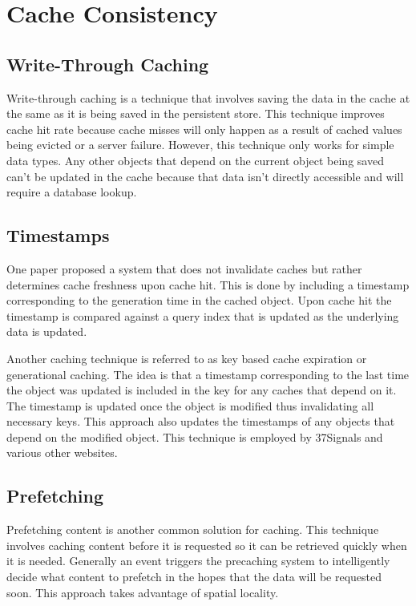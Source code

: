 \documentclass[12pt]{ucthesis}
\begin{document}
\section{Cache Consistency}
\subsection{Write-Through Caching}
Write-through caching is a technique that involves saving the data in the cache at the same as it is being saved in the persistent store.\cite{writeThroughCaching}
This technique improves cache hit rate because cache misses will only happen as a result of cached values being evicted or a server failure.
However, this technique only works for simple data types.
Any other objects that depend on the current object being saved can't be updated in the cache because that data isn't directly accessible and will require a database lookup.

\subsection{Timestamps}
One paper proposed a system that does not invalidate caches but rather determines cache freshness upon cache hit.\cite{cacheInvalidationWebSearch}
This is done by including a timestamp corresponding to the generation time in the cached object.
Upon cache hit the timestamp is compared against a query index that is updated as the underlying data is updated.

Another caching technique is referred to as key based cache expiration\cite{keyBasedCacheExpiration} or generational caching\cite{generationalCaching}.
The idea is that a timestamp corresponding to the last time the object was updated is included in the key for any caches that depend on it.
The timestamp is updated once the object is modified thus invalidating all necessary keys.
This approach also updates the timestamps of any objects that depend on the modified object.
This technique is employed by 37Signals and various other websites.\cite{keyBasedCacheExpiration}

\subsection{Prefetching}
Prefetching content is another common solution for caching.
This technique involves caching content before it is requested so it can be retrieved quickly when it is needed.
Generally an event triggers the precaching system to intelligently decide what content to prefetch in the hopes that the data will be requested soon.
This approach takes advantage of spatial locality.
\end{document}

